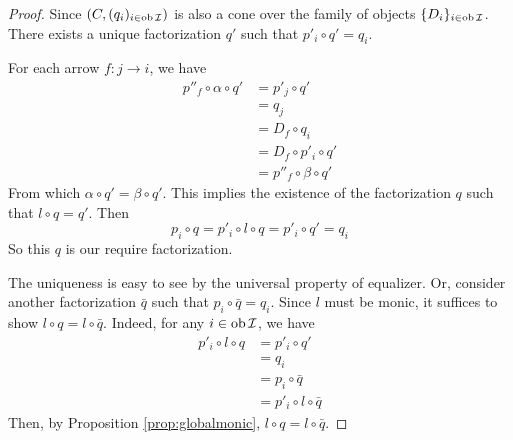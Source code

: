 \begin{proof}
   Since $(C,(q_i)_{i\in\operatorname{ob}{\cal I}})$ is also a cone over the family of objects $\{D_i\}_{i\in\operatorname{ob}{\cal I}}$. There exists a unique factorization $q'$ such that $p'_i\circ q' = q_i$.

   For each arrow $f\colon j\to i$, we have
    \begin{align*}
      p''_f\circ\alpha\circ q' & = p'_j\circ q' \\
                           & = q_j \\
                           & = D_f\circ q_i \\
                           & = D_f\circ p'_i\circ q'\\
                           & = p''_f\circ\beta\circ q'
    \end{align*}
    From which $\alpha\circ q'=\beta\circ q'$. This implies the existence of the factorization $q$ such that $l\circ q=q'$. Then
    \begin{equation*}
      p_i\circ q = p'_i\circ l\circ q = p'_i\circ q' = q_i
    \end{equation*}
    So this $q$ is our require factorization.

    The uniqueness is easy to see by the universal property of equalizer. Or, consider another factorization $\bar{q}$ such that $p_i\circ \bar{q} = q_i$. Since $l$ must be monic, it suffices to show $l\circ q=l\circ\bar{q}$. Indeed, for any $i\in\operatorname{ob}{\cal I}$, we have
    \begin{align*}
      p'_i\circ l\circ q & = p'_i\circ q' \\
                           & = q_i \\
                           & = p_i\circ \bar{q} \\
                           & = p'_i\circ l \circ \bar{q}
    \end{align*}
    Then, by Proposition \ref{prop:globalmonic}, $l\circ q=l\circ\bar{q}$.
  \end{proof}

